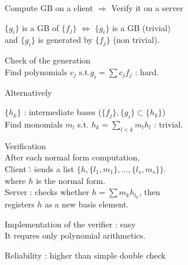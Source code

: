 \documentclass{slides}
\begin{document}
\parskip 5pt
\vskip 3pt
{\color{red} Compute GB on a client $\Rightarrow$ Verify it on a server}

{\color{red} $\{g_i\}$ is a GB of $\{f_j\}$} 
$\Leftrightarrow$ $\{g_i\}$ is a GB (trivial)\\
and {\color{green} $\{g_i\}$ is generated by $\{f_j\}$ (non trivial)}.

\vskip 10pt

{\color{red} Check of the generation}\\
Find {\color{turquoise} polynomials} $c_j$ s.t.$g_i = \sum c_jf_j$ : {\color{red} hard}.

{\color{orange} Alternatively}

$\{h_k\}$ : intermediate bases ($\{f_j\}, \{g_i\}\subset \{h_k\}$)\\
Find {\color{turquoise} monomials} $m_l$ s.t. $h_k = \displaystyle{\sum_{l<k} m_l h_l}$ : {\color{SeaGreen} trivial}.

\medbreak

\begin{tabbing}
{\color{red} Verification}\\
After each normal form computation,\\
{\color{green} Client} \=: \= sends a list $\{h,\{l_1,m_1\},\ldots,\{l_s,m_s\}\}$.\\
\>\>where $h$ is the normal form.\\
{\color{green} Server}  \>: \> checks whether  $h=\sum m_k h_{l_k}$, then\\
\>\> registers $h$ as a new basis element.
\end{tabbing}

\medbreak

{\color{red} Implementation of the verifier} : {\color{SeaGreen}easy}\\
\quad It requres only polynomial arithmetics.

{\color{red} Reliability} : {\color{SeaGreen} higher than simple double check}
\vskip 20pt
\rightline{ {\color{red} {\tt http://www.openxm.org} }}
\end{document}
